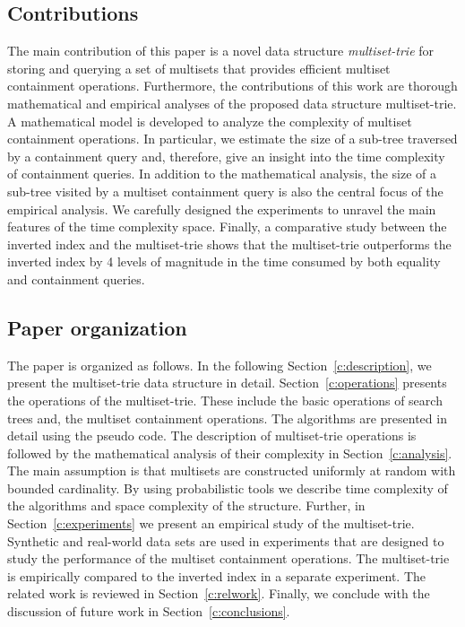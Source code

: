 \subsection{Contributions}

The main contribution of this paper is a novel data structure \emph{multiset-trie} for storing and querying a set of multisets that provides efficient multiset containment operations. Furthermore, the contributions of this work are thorough mathematical and empirical analyses of the proposed data structure multiset-trie. 
%
A mathematical model is developed to analyze the complexity of multiset containment operations. In particular, we estimate the size of a sub-tree traversed by a containment query and, therefore, give an insight into the time complexity of containment queries.  In addition to the mathematical analysis, the size of a sub-tree visited by a multiset containment query is also the central focus of the empirical analysis. We carefully designed the experiments to unravel the main features of the time complexity space. 
%
Finally, a comparative study between the inverted index and the multiset-trie shows that the multiset-trie outperforms the inverted index by 4 levels of magnitude in the time consumed by both equality and containment queries.
%
%
%
%
\subsection{Paper organization}

The paper is organized as follows. In the following Section~\ref{c:description}, we present the multiset-trie data structure in detail.
%
Section~\ref{c:operations} presents the operations of the multiset-trie. These include the basic operations of search trees and, the multiset containment operations. The algorithms are presented in detail using the pseudo code. 
%
The description of multiset-trie operations is followed by the mathematical analysis of their complexity in Section~\ref{c:analysis}. The main assumption is that multisets are constructed uniformly at random with bounded cardinality. By using probabilistic tools we describe time complexity of the algorithms and space complexity of the structure.
%
Further, in Section~\ref{c:experiments} we present an empirical study of the multiset-trie. Synthetic and real-world data sets are used in experiments that are designed to study the performance of the multiset containment operations. The multiset-trie is empirically compared to the inverted index in a separate experiment. %
%
The related work is reviewed in Section~\ref{c:relwork}. 
%
Finally, we conclude with the discussion of future work in Section~\ref{c:conclusions}.
%